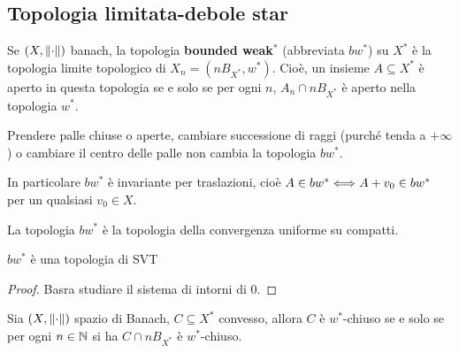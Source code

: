 \subsection{Topologia limitata-debole star}
\begin{definition}
Se $(X,{\left\Vert{\cdot}\right\Vert})$ banach, la topologia \textbf{bounded weak$^\ast$} (abbreviata $bw^\ast$) su $X^\ast$ \`e la topologia limite topologico di $X_n=(nB_{X^\ast},w^\ast)$. Cio\`e, un insieme $A\subseteq X^\ast$ \`e aperto in questa topologia se e solo se per ogni $n$, $A_n\cap n B_{X^\ast}$ \`e aperto nella topologia $w^\ast$.
\end{definition}
\begin{remark}
Prendere palle chiuse o aperte, cambiare successione di raggi (purch\'e tenda a $+\infty$) o cambiare il centro delle palle non cambia la topologia $bw^\ast$.

In particolare $bw^\ast$ \`e invariante per traslazioni, cio\`e $A\in bw^\ast\Longleftrightarrow A+v_0\in bw^\ast$ per un qualsiasi $v_0\in X$.
\end{remark}

\begin{remark}
La topologia $bw^\ast$ \`e la topologia della convergenza uniforme su compatti.
\end{remark}

\begin{remark}
$bw^\ast$ \`e una topologia di SVT
\end{remark}
\begin{proof}
Basra studiare il sistema di intorni di $0$.
\end{proof}



\begin{theorem}\label{ThKreinSmulian}
Sia $(X,{\left\Vert{\cdot}\right\Vert})$ spazio di Banach, $C\subseteq X^\ast$ convesso, allora $C$ \`e $w^\ast$-chiuso se e solo se per ogni $n\in\mathbb{N}$ si ha $C\cap nB_{X^\ast}$ \`e $w^\ast$-chiuso.
\end{theorem}

